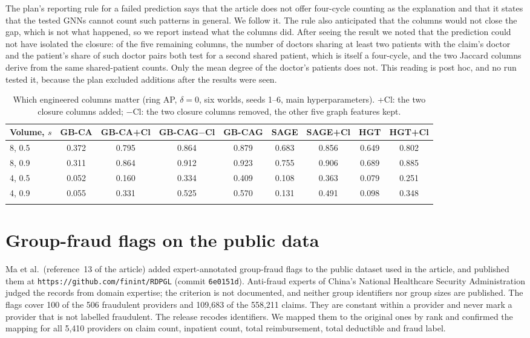 \documentclass[pdflatex,sn-vancouver-num]{sn-jnl}
\newcommand{\MainRefMa}{13}
\begin{document}
The plan's reporting rule for a failed prediction says that the article does not offer four-cycle counting as the
explanation and that it states that the tested GNNs cannot count such patterns in general. We follow it. The rule
also anticipated that the columns would not close the gap, which is not what happened, so we report instead what the
columns did. After seeing the result we noted that the prediction could not have isolated the closure: of the five
remaining columns, the number of doctors sharing at least two patients with the claim's doctor and the patient's
share of such doctor pairs both test for a second shared patient, which is itself a four-cycle, and the two Jaccard
columns derive from the same shared-patient counts. Only the mean degree of the doctor's patients does not. This reading is
post hoc, and no run tested it, because the plan excluded additions after the results were seen.

\begin{table}[h]
\caption{Which engineered columns matter (ring AP, $\delta=0$, six worlds, seeds 1--6, main hyperparameters). +Cl: the two closure columns added; $-$Cl: the two closure columns removed, the other five graph features kept.}\label{tab:closure}
\scriptsize
\setlength{\tabcolsep}{2pt}
\begin{tabular}{@{}lcccccccc@{}}
\toprule
Volume, $s$ & GB-CA & GB-CA+Cl & GB-CAG$-$Cl & GB-CAG & SAGE & SAGE+Cl & HGT & HGT+Cl \\
\midrule
8, 0.5 & 0.372 & 0.795 & 0.864 & 0.879 & 0.683 & 0.856 & 0.649 & 0.802 \\
8, 0.9 & 0.311 & 0.864 & 0.912 & 0.923 & 0.755 & 0.906 & 0.689 & 0.885 \\
4, 0.5 & 0.052 & 0.160 & 0.334 & 0.409 & 0.108 & 0.363 & 0.079 & 0.251 \\
4, 0.9 & 0.055 & 0.331 & 0.525 & 0.570 & 0.131 & 0.491 & 0.098 & 0.348 \\
\botrule
\end{tabular}
\end{table}

\section{Group-fraud flags on the public data}\label{sec:s_group}
Ma et al.\ (reference~\MainRefMa{} of the article) added expert-annotated group-fraud flags to the public dataset used
in the article, and published them at \texttt{https://github.com/finint/RDPGL} (commit \texttt{6e0151d}). Anti-fraud
experts of China's National Healthcare Security Administration judged the records from domain expertise; the criterion
is not documented, and neither group identifiers nor group sizes are published. The flags cover 100 of the 506
fraudulent providers and 109,683 of the 558,211 claims. They are constant within a provider and never mark a provider
that is not labelled fraudulent. The release recodes identifiers. We mapped them to the original ones by rank and
confirmed the mapping for all 5,410 providers on claim count, inpatient count, total reimbursement, total deductible
and fraud label.
\end{document}
